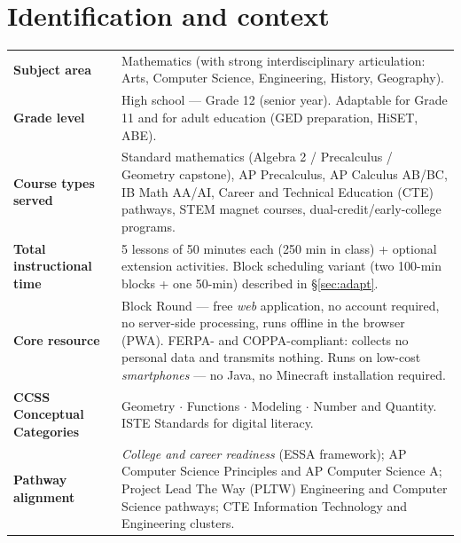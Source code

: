 \documentclass[12pt,a4paper]{scrartcl}
\begin{document}
\renewcommand{\contentsname}{\color{accent}Contents}
\tableofcontents
\thispagestyle{fancy}
\newpage

\section{Identification and context}\label{sec:identification}

\begin{center}
\begin{tabular}{@{}p{}p{}@{}}
\toprule
\textbf{Subject area} & Mathematics (with strong interdisciplinary articulation: Arts, Computer Science, Engineering, History, Geography). \\
\addlinespace[2pt]
\textbf{Grade level} & High school --- Grade 12 (senior year). Adaptable for Grade 11 and for adult education (GED preparation, HiSET, ABE). \\
\addlinespace[2pt]
\textbf{Course types served} & Standard mathematics (Algebra 2 / Precalculus / Geometry capstone), AP Precalculus, AP Calculus AB/BC, IB Math AA/AI, Career and Technical Education (CTE) pathways, STEM magnet courses, dual-credit/early-college programs. \\
\addlinespace[2pt]
\textbf{Total instructional time} & 5 lessons of 50 minutes each (250 min in class) + optional extension activities. Block scheduling variant (two 100-min blocks + one 50-min) described in §\ref{sec:adapt}. \\
\addlinespace[2pt]
\textbf{Core resource} & Block Round --- free \emph{web} application, no account required, no server-side processing, runs offline in the browser (PWA). FERPA- and COPPA-compliant: collects no personal data and transmits nothing. Runs on low-cost \emph{smartphones} --- no Java, no Minecraft installation required. \\
\addlinespace[2pt]
\textbf{CCSS Conceptual Categories} & Geometry $\cdot$ Functions $\cdot$ Modeling $\cdot$ Number and Quantity. ISTE Standards for digital literacy. \\
\addlinespace[2pt]
\textbf{Pathway alignment} & \emph{College and career readiness} (ESSA framework); AP Computer Science Principles and AP Computer Science A; Project Lead The Way (PLTW) Engineering and Computer Science pathways; CTE Information Technology and Engineering clusters. \\

\end{tabular}
\end{center}
\end{document}
